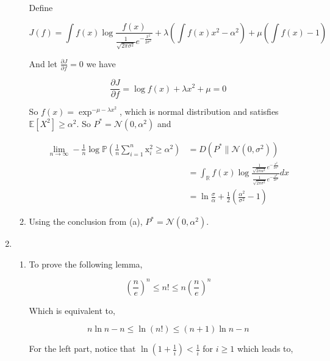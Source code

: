\documentclass[a4paper]{article}
\begin{document}
\begin{enumerate}
\begin{enumerate}
Define 

\begin{equation}
  J(f) = \int f(x) \log{\frac{f(x)}{\frac{1}{\sqrt{2\pi \sigma^2}}e^{-\frac{x^2}{2\sigma^2}}} } + \lambda (\int f(x) x^2  - \alpha^2) + \mu(\int f(x) -1)
\end{equation}


And let $\frac{\partial J}{\partial f} = 0$ we have 

\begin{equation}
  \frac{\partial J}{\partial f} = \log f(x)  + \lambda x^2 + \mu = 0
\end{equation}

So $f(x) = \exp^{-\mu -\lambda x^2}$, which is normal distribution and satisfies $\mathbb{E}[X^2] \geqslant \alpha^2$. So $P^* = \mathcal{N}(0,\alpha^2)$ and 

\begin{equation}
  \begin{aligned}
    \lim_{n \to \infty}-\frac{1}{n} \log \mathbb{P}(\frac{1}{n} \sum_{i=1}^n \mathrm{x}_i^2 \geqslant \alpha^2) & =  D(P^*\| \mathcal{N}(0,\sigma^2))  \\& = \int_{\mathbb{R}} f(x) \log{\frac{\frac{1}{\sqrt{2\pi \alpha^2}}e^{-\frac{x^2}{2\alpha^2}}}{\frac{1}{\sqrt{2\pi \sigma^2}}e^{-\frac{x^2}{2\sigma^2}}} dx} \\
    & = \ln \frac{\sigma}{\alpha} + \frac{1}{2}(\frac{\alpha^2}{\sigma^2}-1)
  \end{aligned}
\end{equation}

\item Using the conclusion from (a), $P^* = \mathcal{N}(0,\alpha^2)$.

\end{enumerate}


\item \begin{enumerate}
  \item To prove the following lemma, 

\begin{equation}
  \left(\frac{n}{e}\right)^{n} \leqslant n ! \leqslant n\left(\frac{n}{e}\right)^{n}
\end{equation}

Which is equivalent to,

\begin{equation}
  n\ln n - n \leqslant \ln(n!) \leqslant (n+1)\ln n - n
\end{equation}

For the left part, notice that $\ln(1+\frac 1 {i})< \frac{1}{i}$ for $i\geqslant 1$ which leads to,


\end{enumerate}
\end{enumerate}
\end{document}
